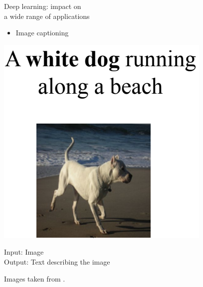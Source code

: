 \begin{frame}{Deep learning: impact on \\a wide range of applications}
\begin{minipage}{0.45\textwidth}
\begin{itemize}
\item Image captioning
\end{itemize}
\vspace{-5mm}
\begin{center}
    \includegraphics[height=0.3\textheight]{figures/applications/image_cap.png}
\end{center}
\vspace{-2mm}
\scriptsize{Input: Image} \\
\scriptsize{Output: Text describing the image}
 \vspace{3mm}
\end{minipage}
\hspace{5mm}
 {\footnotesize Images taken from .}

\end{frame}


